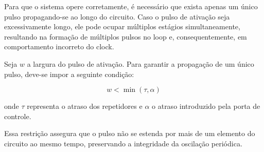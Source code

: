 Para que o sistema opere corretamente, é necessário que exista apenas um único pulso propagando-se ao longo do circuito. Caso o pulso de ativação seja excessivamente longo, ele pode ocupar múltiplos estágios simultaneamente, resultando na formação de múltiplos pulsos no loop e, consequentemente, em comportamento incorreto do clock.

Seja $w$ a largura do pulso de ativação. Para garantir a propagação de um único pulso, deve-se impor a seguinte condição:

\[
w < \min(\tau, \alpha)
\]

onde $\tau$ representa o atraso dos repetidores e $\alpha$ o atraso introduzido pela porta de controle.

Essa restrição assegura que o pulso não se estenda por mais de um elemento do circuito ao mesmo tempo, preservando a integridade da oscilação periódica.